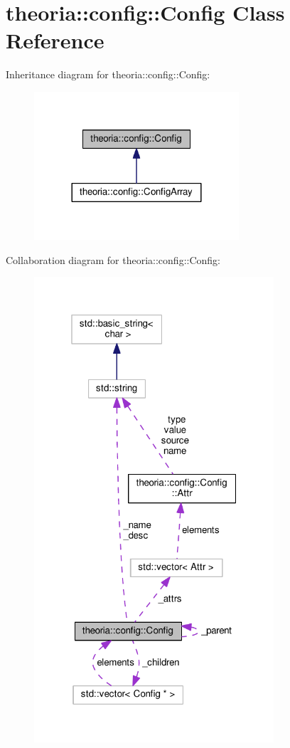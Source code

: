 \hypertarget{classtheoria_1_1config_1_1Config}{}\section{theoria\+:\+:config\+:\+:Config Class Reference}
\label{classtheoria_1_1config_1_1Config}


Inheritance diagram for theoria\+:\+:config\+:\+:Config\+:
\nopagebreak
\begin{figure}[H]
\begin{center}
\leavevmode
\includegraphics[width=216pt]{classtheoria_1_1config_1_1Config__inherit__graph}
\end{center}
\end{figure}


Collaboration diagram for theoria\+:\+:config\+:\+:Config\+:
\nopagebreak
\begin{figure}[H]
\begin{center}
\leavevmode
\includegraphics[width=253pt]{classtheoria_1_1config_1_1Config__coll__graph}
\end{center}
\end{figure}
